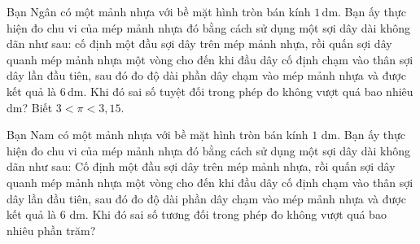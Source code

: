 \begin{bt}%
	Bạn Ngân có một mảnh nhựa với bề mặt hình tròn bán kính $1$\,dm. Bạn ấy thực hiện đo chu vi của mép mảnh nhựa đó bằng cách sử dụng một sợi dây dài không dãn như sau: cố định một đầu sợi dây trên mép mảnh nhựa, rồi quấn sợi dây quanh mép mảnh nhựa một vòng cho đến khi đầu dây cố định chạm vào thân sợi dây lần đầu tiên, sau đó đo độ dài phần dây chạm vào mép mảnh nhựa và được kết quả là $6$\,dm. Khi đó sai số tuyệt đối trong phép đo không vượt quá bao nhiêu dm? Biết $3<\pi <3{,}15$.
	
\end{bt}

\begin{bt}%
Bạn Nam có một mảnh nhựa với bề mặt hình tròn bán kính $1$ dm. Bạn ấy thực hiện đo chu vi của mép mảnh nhựa đó bằng cách sử dụng một sợi dây dài không dãn như sau: Cố định một đầu sợi dây trên mép mảnh nhựa, rồi quấn sợi dây quanh mép mảnh nhựa một vòng cho đến khi đầu dây cố định chạm vào thân sợi dây lần đầu tiên, sau đó đo độ dài phần dây chạm vào mép mảnh nhựa và được kết quả là $6$ dm. Khi đó sai số tương đối trong phép đo không vượt quá bao nhiêu phần trăm?

\end{bt}

